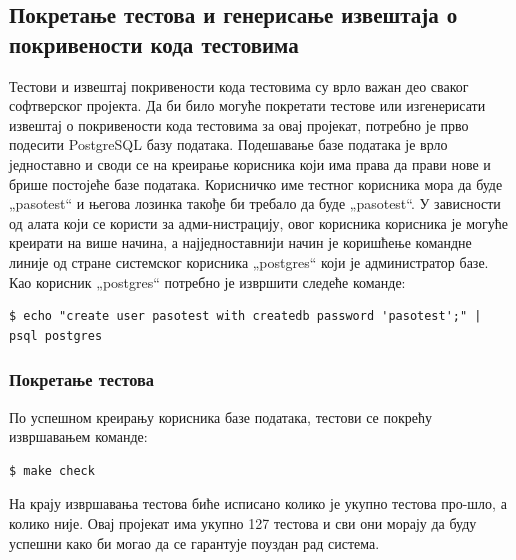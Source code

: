 \documentclass[a4paper, 12pt, diplomski]{etfcyr}
\def\quote#1{„#1“}
\begin{document}
			\newpage

			\subsection[Покретање тестова и извештај о покривености кода]{Покретање тестова и генерисање извештаја о покривености кода тестовима}
				\begin{justify}
					Тестови и извештај покривености кода тестовима су врло важан део сваког софтверског пројекта. Да би било могуће покретати тестове или изгенерисати извештај о покривености кода тестовима за овај пројекат, потребно је прво подесити PostgreSQL базу података. Подешавање базе података је врло једноставно и своди се на креирање корисника који има права да прави нове и брише постојеће базе података. Корисничко име тестног корисника мора да буде \quote{pasotest} и његова лозинка такође би требало да буде \quote{pasotest}. У зависности од алата који се користи за адми-нистрацију, овог корисника корисника је могуће креирати на више начина, а најједноставнији начин је коришћење командне линије од стране системског корисника \quote{postgres} који је администратор базе. Као корисник \quote{postgres} потребно је извршити следеће команде:
					\begin{footnotesize}
						\begin{verbatim}
$ echo "create user pasotest with createdb password 'pasotest';" | psql postgres
						\end{verbatim}
					\end{footnotesize}
				\end{justify}
				
				\subsubsection*{Покретање тестова}
					\begin{justify}
						По успешном креирању корисника базе података, тестови се покрећу извршавањем команде:
						\begin{footnotesize}
							\begin{verbatim}
$ make check
							\end{verbatim}
						\end{footnotesize}
						На крају извршавања тестова биће исписано колико је укупно тестова про-шло, а колико није. Овај пројекат има укупно 127 тестова и сви они морају да буду успешни како би могао да се гарантује поуздан рад система.
					\end{justify}
\end{document}
